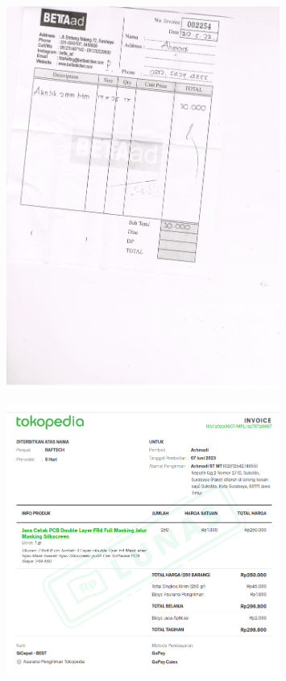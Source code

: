 \documentclass{article} %
\begin{document}
	\begin{figure}[H]
		\centering
		\includegraphics[width=0.8\textwidth]{images/akrilik}
	\end{figure}

	\begin{figure}[H]
		\centering
		\includegraphics[width=0.8\textwidth]{images/pcb1}
	\end{figure}
\end{document}
